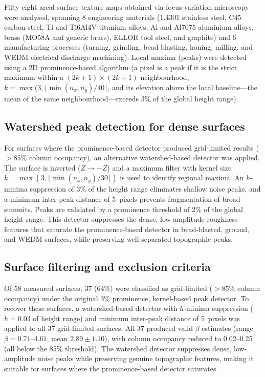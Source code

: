 \documentclass[final,3p,times,twocolumn]{elsarticle}
\theoremstyle{definition}
\begin{document}
Fifty-eight areal surface texture maps obtained via focus-variation
microscopy~\cite{HELMLI-2011-FV, DANZL-2011-FV} were analysed, spanning 8 engineering materials (1.4301
stainless steel, C45 carbon steel, Ti and Ti6Al4V titanium alloys,
Al and Al7075 aluminium alloys, brass (MO58A and generic brass), ELLOR
tool steel, and graphite) and 6 manufacturing processes (turning,
grinding, bead blasting, honing, milling, and WEDM electrical
discharge machining). Local maxima (peaks) were detected using a
2D prominence-based algorithm (a pixel is a peak if it is the
strict maximum within a $(2k+1)\times(2k+1)$ neighbourhood,
$k = \max(3, \lfloor\min(n_x,n_y)/40\rfloor$, and its
elevation above the local baseline---the mean of the same
neighbourhood---exceeds 3\% of the global height range).

\subsection{Watershed peak detection for dense surfaces}

For surfaces where the prominence-based detector produced grid-limited
results ($>85\%$ column occupancy), an alternative watershed-based
detector was applied. The surface is inverted ($Z \to -Z$) and a
maximum filter with kernel size $k = \max(3, \lfloor\min(n_x,n_y)/30\rfloor)$
is used to identify regional maxima. An $h$-minima suppression of
$3\%$ of the height range eliminates shallow noise peaks, and a minimum
inter-peak distance of 5~pixels prevents fragmentation of broad
summits. Peaks are validated by a prominence threshold of $2\%$ of the
global height range. This detector suppresses the dense, low-amplitude
roughness features that saturate the prominence-based detector in
bead-blasted, ground, and WEDM surfaces, while preserving
well-separated topographic peaks.

\subsection{Surface filtering and exclusion criteria}

Of 58 measured surfaces, 37 (64\%) were classified as grid-limited
($>85\%$ column occupancy) under the original 3\% prominence,
kernel-based peak detector. To recover these surfaces, a watershed-based
detector with $h$-minima suppression ($h=0.03$ of height range) and
minimum inter-peak distance of 5~pixels was applied to all 37
grid-limited surfaces. All 37 produced valid $\beta$ estimates (range
$\beta = 0.71$--$4.61$, mean $2.89 \pm 1.10$), with column occupancy
reduced to 0.02--0.25 (all below the 85\% threshold). The watershed
detector suppresses dense, low-amplitude noise peaks while preserving
genuine topographic features, making it suitable for surfaces where
the prominence-based detector saturates.
\end{document}
